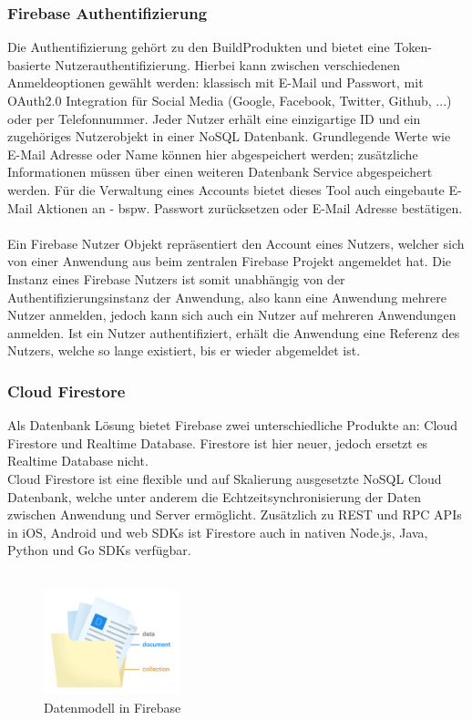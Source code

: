 \subsubsection{Firebase Authentifizierung}
Die Authentifizierung gehört zu den \glqq Build\grqq Produkten und bietet eine Token-basierte Nutzerauthentifizierung. 
Hierbei kann zwischen verschiedenen Anmeldeoptionen gewählt werden: klassisch mit E-Mail und Passwort, mit OAuth2.0 Integration für Social Media (Google, Facebook, Twitter, Github, ...) oder per Telefonnummer.
Jeder Nutzer erhält eine einzigartige ID und ein zugehöriges Nutzerobjekt in einer NoSQL Datenbank. Grundlegende Werte wie E-Mail Adresse oder Name können hier abgespeichert werden; zusätzliche Informationen müssen über einen weiteren Datenbank Service abgespeichert werden.
Für die Verwaltung eines Accounts bietet dieses Tool auch eingebaute E-Mail Aktionen an - bspw. Passwort zurücksetzen oder E-Mail Adresse bestätigen.\\
\\
Ein Firebase Nutzer Objekt repräsentiert den Account eines Nutzers, welcher sich von einer Anwendung aus beim zentralen Firebase Projekt angemeldet hat.
Die Instanz eines Firebase Nutzers ist somit unabhängig von der Authentifizierungsinstanz der Anwendung, also kann eine Anwendung mehrere Nutzer anmelden, jedoch kann sich auch ein Nutzer auf mehreren Anwendungen anmelden.
Ist ein Nutzer authentifiziert, erhält die Anwendung eine Referenz des Nutzers, welche so lange existiert, bis er wieder abgemeldet ist.\cite{firebase2021}

\subsubsection{Cloud Firestore}
\label{sec:firestore}
Als Datenbank Lösung bietet Firebase zwei unterschiedliche Produkte an: Cloud Firestore und Realtime Database.
Firestore ist hier neuer, jedoch ersetzt es Realtime Database nicht. \\
Cloud Firestore ist eine flexible und auf Skalierung ausgesetzte NoSQL Cloud Datenbank, welche unter anderem die Echtzeitsynchronisierung der Daten zwischen Anwendung und Server ermöglicht.
Zusätzlich zu REST und RPC APIs in iOS, Android und web SDKs ist Firestore auch in nativen Node.js, Java, Python und Go SDKs verfügbar.\\
\\

\begin{figure}
	\begin{center}
		\includegraphics[width=0.35\textwidth]{images/firestore_datastucture.png}
	\end{center}
	\caption{Datenmodell in Firebase \protect \footnotemark}
	\label{fig:firestore_data_structure}
\end{figure}

